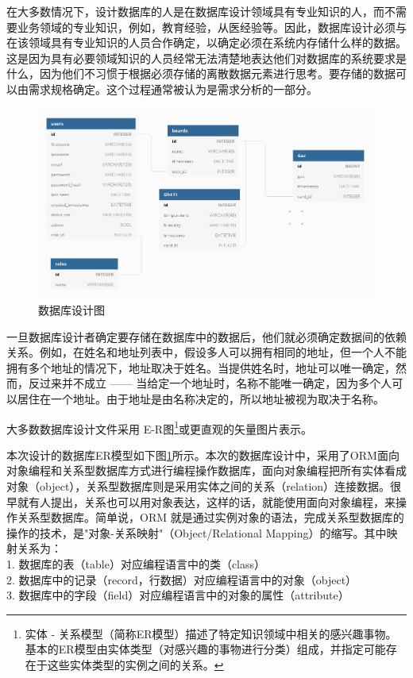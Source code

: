 在大多数情况下，设计数据库的人是在数据库设计领域具有专业知识的人，而不需要业务领域的专业知识，例如，教育经验，从医经验等。因此，数据库设计必须与在该领域具有专业知识的人员合作确定，以确定必须在系统内存储什么样的数据。这是因为具有必要领域知识的人员经常无法清楚地表达他们对数据库的系统要求是什么，因为他们不习惯于根据必须存储的离散数据元素进行思考。要存储的数据可以由需求规格确定。这个过程通常被认为是需求分析的一部分。

\begin{figure}[htbp]
	\centering
	\includegraphics[width=1\linewidth]{figure/2-7}
	\caption{数据库设计图}
	\label{fig:2-7}
\end{figure}

一旦数据库设计者确定要存储在数据库中的数据后，他们就必须确定数据间的依赖关系。例如，在姓名和地址列表中，假设多人可以拥有相同的地址，但一个人不能拥有多个地址的情况下，地址取决于姓名。当提供姓名时，地址可以唯一确定，然而，反过来并不成立 —— 当给定一个地址时，名称不能唯一确定，因为多个人可以居住在一个地址。由于地址是由名称决定的，所以地址被视为取决于名称。

大多数数据库设计文件采用 
E-R图\footnote{实体 - 关系模型（简称ER模型）描述了特定知识领域中相关的感兴趣事物。基本的ER模型由实体类型（对感兴趣的事物进行分类）组成，并指定可能存在于这些实体类型的实例之间的关系。}或更直观的矢量图片表示。

本次设计的数据库ER模型如下图\ref{fig:2-7}所示。本次的数据库设计中，采用了ORM面向对象编程和关系型数据库方式进行编程操作数据库，面向对象编程把所有实体看成对象（object），关系型数据库则是采用实体之间的关系（relation）连接数据。很早就有人提出，关系也可以用对象表达，这样的话，就能使用面向对象编程，来操作关系型数据库。简单说，ORM 就是通过实例对象的语法，完成关系型数据库的操作的技术，是"对象-关系映射"（Object/Relational Mapping）的缩写。其中映射关系为：
\\ 1. 数据库的表（table）对应编程语言中的类（class）
\\ 2. 数据库中的记录（record，行数据）对应编程语言中的对象（object） 
\\ 3. 数据库中的字段（field）对应编程语言中的对象的属性（attribute）

